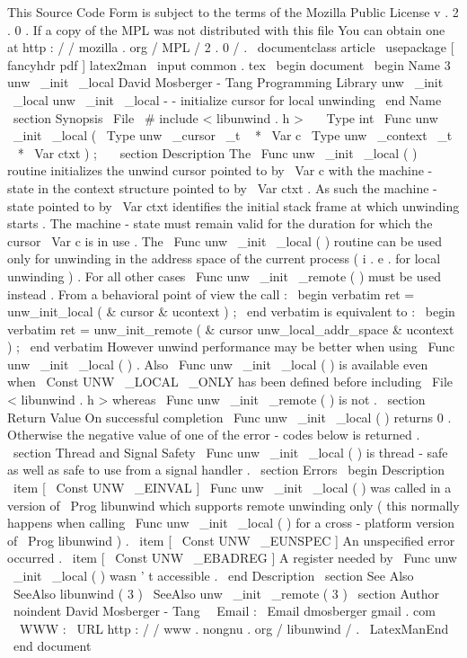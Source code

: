 %
This
Source
Code
Form
is
subject
to
the
terms
of
the
Mozilla
Public
%
License
v
.
2
.
0
.
If
a
copy
of
the
MPL
was
not
distributed
with
this
%
file
You
can
obtain
one
at
http
:
/
/
mozilla
.
org
/
MPL
/
2
.
0
/
.
\
documentclass
{
article
}
\
usepackage
[
fancyhdr
pdf
]
{
latex2man
}
\
input
{
common
.
tex
}
\
begin
{
document
}
\
begin
{
Name
}
{
3
}
{
unw
\
_init
\
_local
}
{
David
Mosberger
-
Tang
}
{
Programming
Library
}
{
unw
\
_init
\
_local
}
unw
\
_init
\
_local
-
-
initialize
cursor
for
local
unwinding
\
end
{
Name
}
\
section
{
Synopsis
}
\
File
{
\
#
include
<
libunwind
.
h
>
}
\
\
\
Type
{
int
}
\
Func
{
unw
\
_init
\
_local
}
(
\
Type
{
unw
\
_cursor
\
_t
~
*
}
\
Var
{
c
}
\
Type
{
unw
\
_context
\
_t
~
*
}
\
Var
{
ctxt
}
)
;
\
\
\
section
{
Description
}
The
\
Func
{
unw
\
_init
\
_local
}
(
)
routine
initializes
the
unwind
cursor
pointed
to
by
\
Var
{
c
}
with
the
machine
-
state
in
the
context
structure
pointed
to
by
\
Var
{
ctxt
}
.
As
such
the
machine
-
state
pointed
to
by
\
Var
{
ctxt
}
identifies
the
initial
stack
frame
at
which
unwinding
starts
.
The
machine
-
state
must
remain
valid
for
the
duration
for
which
the
cursor
\
Var
{
c
}
is
in
use
.
The
\
Func
{
unw
\
_init
\
_local
}
(
)
routine
can
be
used
only
for
unwinding
in
the
address
space
of
the
current
process
(
i
.
e
.
for
local
unwinding
)
.
For
all
other
cases
\
Func
{
unw
\
_init
\
_remote
}
(
)
must
be
used
instead
.
From
a
behavioral
point
of
view
the
call
:
\
begin
{
verbatim
}
ret
=
unw_init_local
(
&
cursor
&
ucontext
)
;
\
end
{
verbatim
}
is
equivalent
to
:
\
begin
{
verbatim
}
ret
=
unw_init_remote
(
&
cursor
unw_local_addr_space
&
ucontext
)
;
\
end
{
verbatim
}
However
unwind
performance
may
be
better
when
using
\
Func
{
unw
\
_init
\
_local
}
(
)
.
Also
\
Func
{
unw
\
_init
\
_local
}
(
)
is
available
even
when
\
Const
{
UNW
\
_LOCAL
\
_ONLY
}
has
been
defined
before
including
\
File
{
<
libunwind
.
h
>
}
whereas
\
Func
{
unw
\
_init
\
_remote
}
(
)
is
not
.
\
section
{
Return
Value
}
On
successful
completion
\
Func
{
unw
\
_init
\
_local
}
(
)
returns
0
.
Otherwise
the
negative
value
of
one
of
the
error
-
codes
below
is
returned
.
\
section
{
Thread
and
Signal
Safety
}
\
Func
{
unw
\
_init
\
_local
}
(
)
is
thread
-
safe
as
well
as
safe
to
use
from
a
signal
handler
.
\
section
{
Errors
}
\
begin
{
Description
}
\
item
[
\
Const
{
UNW
\
_EINVAL
}
]
\
Func
{
unw
\
_init
\
_local
}
(
)
was
called
in
a
version
of
\
Prog
{
libunwind
}
which
supports
remote
unwinding
only
(
this
normally
happens
when
calling
\
Func
{
unw
\
_init
\
_local
}
(
)
for
a
cross
-
platform
version
of
\
Prog
{
libunwind
}
)
.
\
item
[
\
Const
{
UNW
\
_EUNSPEC
}
]
An
unspecified
error
occurred
.
\
item
[
\
Const
{
UNW
\
_EBADREG
}
]
A
register
needed
by
\
Func
{
unw
\
_init
\
_local
}
(
)
wasn
'
t
accessible
.
\
end
{
Description
}
\
section
{
See
Also
}
\
SeeAlso
{
libunwind
(
3
)
}
\
SeeAlso
{
unw
\
_init
\
_remote
(
3
)
}
\
section
{
Author
}
\
noindent
David
Mosberger
-
Tang
\
\
Email
:
\
Email
{
dmosberger
gmail
.
com
}
\
\
WWW
:
\
URL
{
http
:
/
/
www
.
nongnu
.
org
/
libunwind
/
}
.
\
LatexManEnd
\
end
{
document
}
